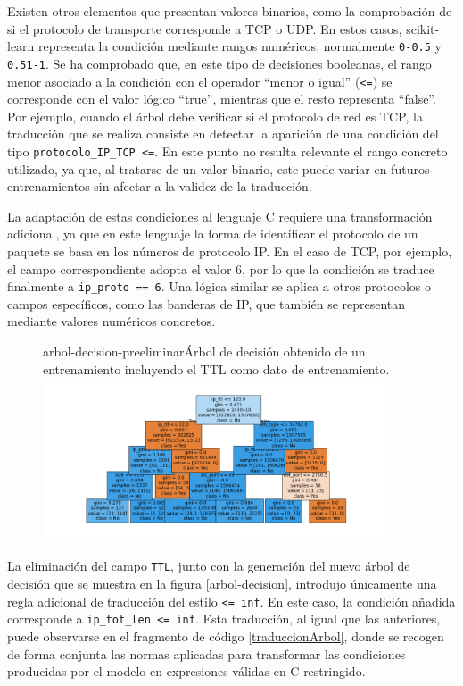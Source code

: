 Existen otros elementos que presentan valores binarios, como la comprobación de si el protocolo de transporte corresponde a TCP o UDP. En estos casos, scikit-learn representa la condición mediante rangos numéricos, normalmente \verb|0-0.5| y \verb|0.51-1|. Se ha comprobado que, en este tipo de decisiones booleanas, el rango menor asociado a la condición con el operador ``menor o igual'' (\verb|<=|) se corresponde con el valor lógico ``true'', mientras que el resto representa ``false''. Por ejemplo, cuando el árbol debe verificar si el protocolo de red es TCP, la traducción que se realiza consiste en detectar la aparición de una condición del tipo \verb|protocolo_IP_TCP <=|. En este punto no resulta relevante el rango concreto utilizado, ya que, al tratarse de un valor binario, este puede variar en futuros entrenamientos sin afectar a la validez de la traducción.

La adaptación de estas condiciones al lenguaje C requiere una transformación adicional, ya que en este lenguaje la forma de identificar el protocolo de un paquete se basa en los números de protocolo IP. En el caso de TCP, por ejemplo, el campo correspondiente adopta el valor 6, por lo que la condición se traduce finalmente a \verb|ip_proto == 6|. Una lógica similar se aplica a otros protocolos o campos específicos, como las banderas de IP, que también se representan mediante valores numéricos concretos.

\begin{figure}[Árbol de Decisión Preeliminar]{arbol-decision-preeliminar}{Árbol de decisión obtenido de un entrenamiento incluyendo el TTL como dato de entrenamiento.}
	\includegraphics[width=0.9\textwidth]{capturas/arbolrw1_mej.png}
\end{figure}

La eliminación del campo \verb|TTL|, junto con la generación del nuevo árbol de decisión que se muestra en la figura \ref{arbol-decision}, introdujo únicamente una regla adicional de traducción del estilo \verb|<= inf|. En este caso, la condición añadida corresponde a \verb|ip_tot_len <= inf|. Esta traducción, al igual que las anteriores, puede observarse en el fragmento de código \ref{traduccionArbol}, donde se recogen de forma conjunta las normas aplicadas para transformar las condiciones producidas por el modelo en expresiones válidas en C restringido.

